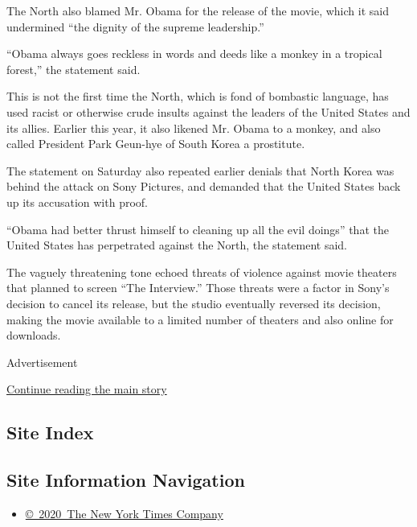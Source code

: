 The North also blamed Mr. Obama for the release of the movie, which it
said undermined ``the dignity of the supreme leadership.''

``Obama always goes reckless in words and deeds like a monkey in a
tropical forest,'' the statement said.

This is not the first time the North, which is fond of bombastic
language, has used racist or otherwise crude insults against the leaders
of the United States and its allies. Earlier this year, it also likened
Mr. Obama to a monkey, and also called President Park Geun-hye of South
Korea a prostitute.

The statement on Saturday also repeated earlier denials that North Korea
was behind the attack on Sony Pictures, and demanded that the United
States back up its accusation with proof.

``Obama had better thrust himself to cleaning up all the evil doings''
that the United States has perpetrated against the North, the statement
said.

The vaguely threatening tone echoed threats of violence against movie
theaters that planned to screen ``The Interview.'' Those threats were a
factor in Sony's decision to cancel its release, but the studio
eventually reversed its decision, making the movie available to a
limited number of theaters and also online for downloads.

Advertisement

\protect\hyperlink{after-bottom}{Continue reading the main story}

\hypertarget{site-index}{%
\subsection{Site Index}\label{site-index}}

\hypertarget{site-information-navigation}{%
\subsection{Site Information
Navigation}\label{site-information-navigation}}

\begin{itemize}
\tightlist
\item
  \href{https://help.nytimes.com/hc/en-us/articles/115014792127-Copyright-notice}{©~2020~The
  New York Times Company}
\end{itemize}

